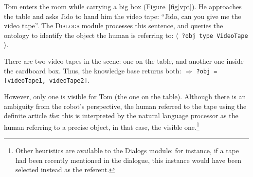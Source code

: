 \documentclass[preprint,3p,times]{elsarticle}
\newcommand{\concept}[1]{{\small \texttt{#1}}}
\newcommand{\stmt}[1]{{\footnotesize \tt $\langle$ #1\relax$\rangle$}}
\begin{document}
Tom enters the room while carrying a big box (Figure~\ref{fig|vpt}). He
approaches the table and asks Jido to hand him the video tape: ``Jido, can
you give me the video tape''. The \textsc{Dialogs} module processes this
sentence, and queries the ontology to
identify the object the human is referring to: \stmt{?obj type VideoTape}. 

There are two video tapes in the scene: one on the table, and another one
inside the cardboard box. Thus, the knowledge base returns both: $\Rightarrow$
\concept{?obj = [videoTape1, videoTape2]}. 

However, only one is visible for Tom (the one on the table). Although there is
an ambiguity from the robot's perspective, the human referred to the tape using
the definite article \emph{the}: this is interpreted by the natural language
processor as the human referring to a precise object, in that case, the visible
one.\footnote{Other heuristics are available to the {\sc Dialogs} module: for
instance, if a tape had been recently mentioned in the dialogue, this instance
would have been selected instead as the referent.}
\end{document}
